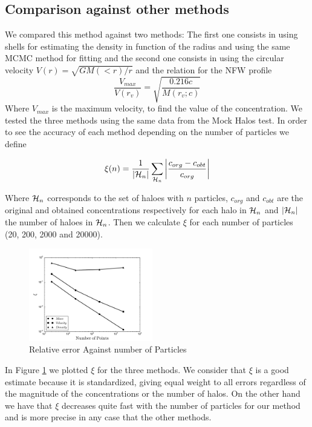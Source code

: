 \documentclass[useAMS,usenatbib]{mn2e}
\begin{document}
\subsection{Comparison against other methods}
We compared this method against two methods: The first one consists in using shells for estimating the density in function of the radius and using the same MCMC method for fitting and the second one consists in using the circular velocity $V(r)=\sqrt{GM(<r)/r}$ and the relation for the NFW profile
\begin{equation}
\frac{V_{max}}{V(r_{v})} = \sqrt{\frac{0.216c}{M(r_{v};c)}}
\end{equation}
Where $V_{max}$ is the maximum velocity, to find the value of the concentration. We tested the three methods using the same data from the Mock Halos test. In order to see the accuracy of each method depending on the number of particles we define 

\begin{equation}
\xi(n)=\frac{1}{\left|{\cal{H}}_n\right|}\sum_{{\cal{H}}_n}\left|\frac{c_{org}-c_{obt}}{c_{org}}\right|
\end{equation}

Where ${\cal{H}}_n$ corresponds to the set of haloes with $n$ particles, $c_{org}$ and $c_{obt}$ are the original and obtained concentrations respectively for each halo in ${\cal{H}}_n$ and $\left|{\cal{H}}_n\right|$ the number of haloes in ${\cal{H}}_n$. Then we calculate $\xi$ for each number of particles (20, 200, 2000 and 20000).

\begin{figure}
\begin{center}
  \includegraphics[width=0.48\textwidth]{error.pdf}
\end{center}
\caption{Relative error Against number of Particles
    \label{fig:error}}
\end{figure}

In Figure \ref{fig:error} we plotted $\xi$ for the three methods. We consider that $\xi$ is a good estimate because it is standardized, giving equal weight to all errors regardless of the magnitude of the concentrations or the number of halos. On the other hand we have that $\xi$ decreases quite fast with the number of particles for our method and is more precise in any case that the other methods.
\end{document}

